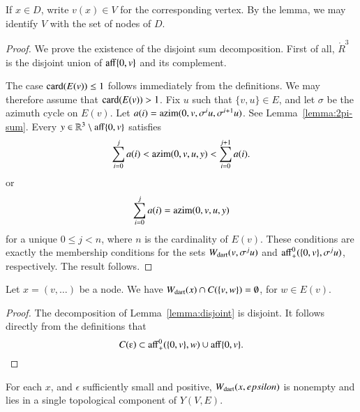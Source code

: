 If $x\in D$, write $v(x)\in V$ for the corresponding vertex.  By the lemma,
we may identify $V$ with the set of nodes of $D$.

\begin{proof}
We prove the existence of the disjoint sum decomposition.
First of all, $\ring{R}^3$ is the disjoint union of ${\operatorname{aff}}\{0,v\}$
and its complement.

The case ${\operatorname{card}}(E(v))\le 1$ follows immediately from the definitions.  
We may therefore assume  that ${\operatorname{card}}(E(v)) >1$.
Fix $u$ such that $\{v,u\}\in E$, and let $\sigma$ be the azimuth
cycle on $E(v)$.  Let $a(i)={\operatorname{azim}}(0,v,\sigma^i u,\sigma^{i+1}u)$.   See Lemma~\ref{lemma:2pi-sum}.  Every $y\in\mathbb{R}^3\setminus{\operatorname{aff}}\{0,v\}$ satisfies
$$
\sum_{i=0}^j a(i) <
{\operatorname{azim}}(0,v,u,y) < \sum_{i=0}^{j+1} a(i).
$$
or 
$$
\sum_{i=0}^j a(i) = {\operatorname{azim}}(0,v,u,y)
$$
for a unique $0 \le j < n$, where $n$ is the cardinality of $E(v)$. 
These conditions are exactly the membership conditions for the sets
$
W_{\text{dart}}(v,\sigma^j u)
$
and ${\operatorname{aff}}_+^0(\{0,v\},\sigma^j u)$, respectively.
The result follows.
\end{proof}

\begin{corollary}
Let $x = (v,\ldots)$ be a node.
We have $W_{\text{dart}}(x)\cap C(\{v,w\})=\emptyset$, for $w\in E(v)$.
\end{corollary}

\begin{proof} The decomposition of Lemma~\ref{lemma:disjoint} is
disjoint.  It follows directly from the definitions that
   $$C(\e)\subset \op{aff}_+^0(\{\orz,v\},w) \cup 
    \op{aff}\{\orz,v\}.$$
\end{proof}

\begin{lemma} 
For each $x$, and $\epsilon$ sufficiently small and positive,
$W_{\text{dart}}(x,epsilon)$ is nonempty and lies in a single 
topological component of $Y(V,E)$.
\end{lemma}

